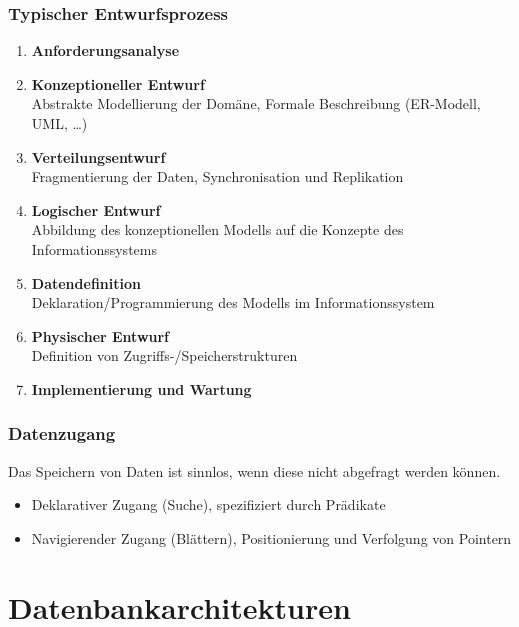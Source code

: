 \documentclass[a4paper, 11pt, accentcolor = tud3b]{tudreport}
\begin{document}
            \subsection{Typischer Entwurfsprozess} %
                \begin{enumerate}
                	\item \textbf{Anforderungsanalyse}
                	\item \textbf{Konzeptioneller Entwurf} \\ Abstrakte Modellierung der Domäne, Formale Beschreibung (ER-Modell, UML, \dots)
                	\item \textbf{Verteilungsentwurf} \\ Fragmentierung der Daten, Synchronisation und Replikation
                	\item \textbf{Logischer Entwurf} \\ Abbildung des konzeptionellen Modells auf die Konzepte des Informationssystems
                	\item \textbf{Datendefinition} \\ Deklaration/Programmierung des Modells im Informationssystem
                	\item \textbf{Physischer Entwurf} \\ Definition von Zugriffs-/Speicherstrukturen
                	\item \textbf{Implementierung und Wartung}
                \end{enumerate}

            \subsection{Datenzugang} %
                Das Speichern von Daten ist sinnlos, wenn diese nicht abgefragt werden können.
                
                \begin{itemize}
                	\item Deklarativer Zugang (Suche), spezifiziert durch Prädikate
                	\item Navigierender Zugang (Blättern), Positionierung und Verfolgung von Pointern
                \end{itemize}

    \chapter{Datenbankarchitekturen} %
	    \label{c:dbarchs}
    
\end{document}
